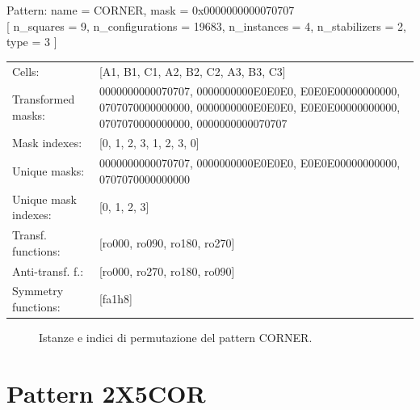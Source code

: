 \begin{tcolorbox}[sharp corners, fontupper=\ttfamily\small, colback=white]
  \noindent Pattern: name = CORNER, mask = 0x0000000000070707\\
  {[} n\_squares = 9, n\_configurations = 19683,
  n\_instances = 4, n\_stabilizers = 2, type = 3 { ]}\\[1.0ex]
  \begin{tabularx}{\textwidth}{@{} p{3.5cm} X @{}}
    Cells:               & {[}A1, B1, C1, A2, B2, C2, A3, B3, C3{]}\\[0.5ex]
    Transformed masks:   & 0000000000070707, 0000000000E0E0E0, E0E0E00000000000, 0707070000000000, 0000000000E0E0E0, E0E0E00000000000, 0707070000000000, 0000000000070707\\[0.5ex]
    Mask indexes:        & {[}0, 1, 2, 3, 1, 2, 3, 0{]}\\[0.5ex]
    Unique masks:        & 0000000000070707, 0000000000E0E0E0, E0E0E00000000000, 0707070000000000\\[0.5ex]
    Unique mask indexes: & {[}0, 1, 2, 3{]}\\[0.5ex]
    Transf. functions:   & {[}ro000, ro090, ro180, ro270{]}\\[0.5ex]
    Anti-transf. f.:     & {[}ro000, ro270, ro180, ro090{]}\\[0.5ex]
    Symmetry functions:  & {[}fa1h8{]}\\[0.5ex]
  \end{tabularx}
\end{tcolorbox}

\begin{figure}[htbp]
  \centering
   \hfill
   \hfill
   \hfill
  \vspace{0.3cm}
   \hfill
   \hfill
   \hfill
  \caption{Istanze e indici di permutazione del pattern CORNER.}
\end{figure}

\newpage

\section{Pattern 2X5COR}

